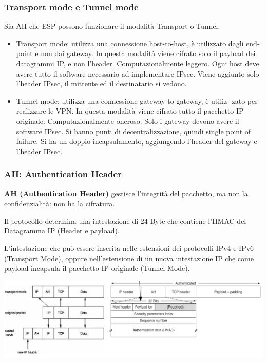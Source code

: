         \subsubsection{Transport mode e Tunnel mode}
            Sia AH che ESP possono funzionare il modalità Transport o Tunnel.
            \begin{itemize}
                \item Transport mode: utilizza una connessione host-to-host, è utilizzato dagli end-point e non dai gateway. In questa modalità viene cifrato solo il payload dei datagrammi IP, e non l'header. Computazionalmente leggero. Ogni host deve avere tutto il software necessario ad implementare IPsec. Viene aggiunto solo l'header IPsec, il mittente ed il destinatario si vedono.
                \item Tunnel mode: utilizza una connessione gateway-to-gateway, è utiliz- zato per realizzare le VPN. In questa modalità viene cifrato tutto il pacchetto IP originale. Computazionalmente oneroso. Solo i gateway devono avere il software IPsec. Si hanno punti di decentralizzazione, quindi single point of failure. Si ha un doppio incapsulamento, aggiungendo l'header del gateway e l'header IPsec.
            \end{itemize}

        \subsubsection{AH: Authentication Header}
            \textbf{AH (Authentication Header)} gestisce l'integrità del pacchetto, ma non la confidenzialità: non ha la cifratura.
        
            Il protocollo determina una intestazione di 24 Byte che contiene l'HMAC del Datagramma IP (Header e payload).
        
            L'intestazione che può essere inserita nelle estensioni dei protocolli IPv4 e IPv6 (Transport Mode), oppure nell'estensione di un nuova intestazione IP che come payload incapsula il pacchetto IP originale (Tunnel Mode).

            \begin{center}
                \includegraphics[scale=0.31]{chapters/7/assets/schema_zz.png}
            \end{center}

